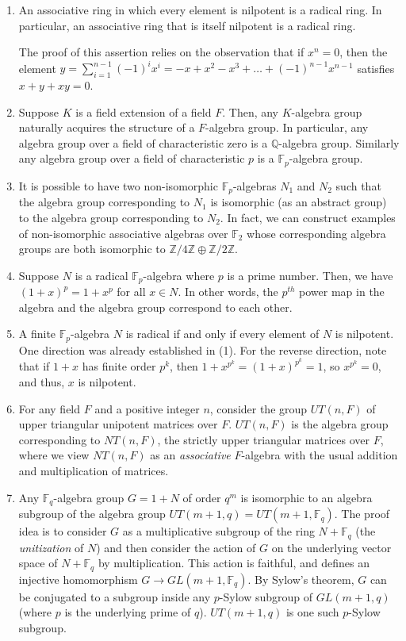 \documentclass{ucetd}
\begin{document}
\begin{enumerate}
\item An associative ring in which every element is nilpotent is a
  radical ring. In particular, an associative ring that is itself
  nilpotent is a radical ring.

  The proof of this assertion relies on the observation that if $x^n =
  0$, then the element $y = \sum_{i=1}^{n-1} (-1)^ix^i = -x + x^2 -
  x^3 + \dots + (-1)^{n-1}x^{n-1}$ satisfies $x + y + xy = 0$.
\item Suppose $K$ is a field extension of a field $F$. Then, any
  $K$-algebra group naturally acquires the structure of a $F$-algebra
  group. In particular, any algebra group over a field of
  characteristic zero is a $\mathbb{Q}$-algebra group. Similarly any
  algebra group over a field of characteristic $p$ is a
  $\mathbb{F}_p$-algebra group.
\item It is possible to have two non-isomorphic
  $\mathbb{F}_p$-algebras $N_1$ and $N_2$ such that the algebra group
  corresponding to $N_1$ is isomorphic (as an abstract group) to the algebra group
  corresponding to $N_2$. In fact, we can construct examples of
  non-isomorphic associative algebras over $\mathbb{F}_2$ whose
  corresponding algebra groups are both isomorphic to
  $\mathbb{Z}/4\mathbb{Z} \oplus \mathbb{Z}/2\mathbb{Z}$.
\item Suppose $N$ is a radical $\mathbb{F}_p$-algebra where $p$ is a
  prime number. Then, we have $(1 + x)^p = 1 + x^p$ for all $x \in
  N$. In other words, the $p^{th}$ power map in the algebra and the
  algebra group correspond to each other.
\item A finite $\mathbb{F}_p$-algebra $N$ is radical if and only if
  every element of $N$ is nilpotent. One direction was already
  established in (1). For the reverse direction, note that if $1 + x$ has
  finite order $p^k$, then $1 + x^{p^k} = (1 + x)^{p^k} = 1$, so
  $x^{p^k} = 0$, and thus, $x$ is nilpotent.
\item For any field $F$ and a positive integer $n$, consider the group
  $UT(n,F)$ of upper triangular unipotent matrices over $F$. $UT(n,F)$
  is the algebra group corresponding to $NT(n,F)$, the strictly upper
  triangular matrices over $F$, where we view $NT(n,F)$ as an {\em
    associative} $F$-algebra with the usual addition and
  multiplication of matrices.
\item Any $\mathbb{F}_q$-algebra group $G = 1 + N$ of order $q^m$ is
  isomorphic to an algebra subgroup of the algebra group $UT(m+1,q) =
  UT(m+1,\mathbb{F}_q)$. The proof idea is to consider $G$ as a
  multiplicative subgroup of the ring $N + \mathbb{F}_q$ (the {\em
    unitization} of $N$) and then consider the action of $G$ on the
  underlying vector space of $N + \mathbb{F}_q$ by
  multiplication. This action is faithful, and defines an injective
  homomorphism $G \to GL(m+1,\mathbb{F}_q)$. By Sylow's theorem, $G$
  can be conjugated to a subgroup inside any $p$-Sylow subgroup of
  $GL(m+1,q)$ (where $p$ is the underlying prime of $q$). $UT(m+1,q)$
  is one such $p$-Sylow subgroup.
\end{enumerate}
\end{document}
